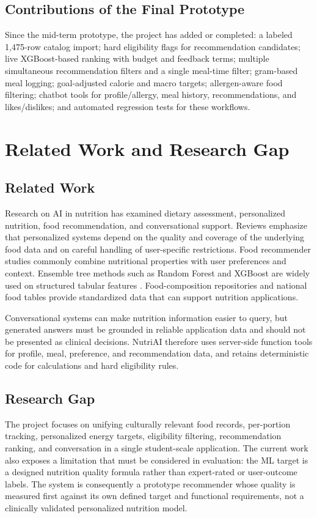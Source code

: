 \documentclass[12pt,a4paper]{report}
\begin{document}
\section{Contributions of the Final Prototype}
Since the mid-term prototype, the project has added or completed: a labeled 1,475-row
catalog import; hard eligibility flags for recommendation candidates; live XGBoost-based
ranking with budget and feedback terms; multiple simultaneous recommendation filters
and a single meal-time filter; gram-based meal logging; goal-adjusted calorie and macro
targets; allergen-aware food filtering; chatbot tools for profile/allergy, meal history,
recommendations, and likes/dislikes; and automated regression tests for these workflows.

\chapter{Related Work and Research Gap}
\section{Related Work}
Research on AI in nutrition has examined dietary assessment, personalized nutrition,
food recommendation, and conversational support. Reviews emphasize that personalized
systems depend on the quality and coverage of the underlying food data and on careful
handling of user-specific restrictions. Food recommender studies commonly combine
nutritional properties with user preferences and context. Ensemble tree methods such as
Random Forest and XGBoost are widely used on structured tabular features
\cite{breiman2001,chen2016}. Food-composition repositories and national food tables
provide standardized data that can support nutrition applications.

Conversational systems can make nutrition information easier to query, but generated
answers must be grounded in reliable application data and should not be presented as
clinical decisions. NutriAI therefore uses server-side function tools for profile, meal,
preference, and recommendation data, and retains deterministic code for calculations and
hard eligibility rules.

\section{Research Gap}
The project focuses on unifying culturally relevant food records, per-portion tracking,
personalized energy targets, eligibility filtering, recommendation ranking, and
conversation in a single student-scale application. The current work also exposes a
limitation that must be considered in evaluation: the ML target is a designed nutrition
quality formula rather than expert-rated or user-outcome labels. The system is consequently
a prototype recommender whose quality is measured first against its own defined target
and functional requirements, not a clinically validated personalized nutrition model.
\end{document}

